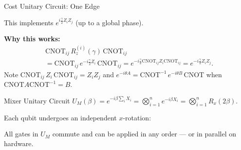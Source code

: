 \documentclass{beamer}
\begin{document}
\begin{frame}{Cost Unitary Circuit: One Edge}
\centering
{}

\medskip
\raggedright
This implements $e^{i\frac{\gamma}{2}Z_iZ_j}$ (up to a global phase).

\medskip

\textbf{Why this works:}
\begin{align*}
&\mathrm{CNOT}_{ij}\,R_z^{(i)}(\gamma)\,\mathrm{CNOT}_{ij}\\
&= \mathrm{CNOT}_{ij}\,e^{-i\frac{\gamma}{2}Z_i}\,\mathrm{CNOT}_{ij}
= e^{-i\frac{\gamma}{2}\mathrm{CNOT}_{ij}Z_i\mathrm{CNOT}_{ij}}
= e^{-i\frac{\gamma}{2}Z_iZ_j}.
\end{align*}
Note $\mathrm{CNOT}_{ij}\,Z_i\,\mathrm{CNOT}_{ij} = Z_i Z_j$ and
$e^{-i\theta A} = \mathrm{CNOT}^{-1}\,e^{-i\theta B}\,\mathrm{CNOT}$
when $\mathrm{CNOT}A\mathrm{CNOT}^{-1}=B$.
\end{frame}


\begin{frame}{Mixer Unitary Circuit}
$U_M(\beta) = e^{-i\beta\sum_i X_i}
= \bigotimes_{i=1}^n e^{-i\beta X_i}
= \bigotimes_{i=1}^n R_x(2\beta).$

Each qubit undergoes an independent $x$-rotation:

\medskip
\centering
{}

\medskip
\raggedright
All gates in $U_M$ commute and can be applied in any order --- or in
parallel on hardware.
\end{frame}
\end{document}
